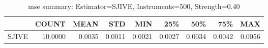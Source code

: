 \begin{table}[ht]
\centering
\caption{mse summary: Estimator=SJIVE, Instruments=500, Strength=0.40}
\begin{tabular}{lrrrrrrrr}
\toprule
 & COUNT & MEAN & STD & MIN & 25\% & 50\% & 75\% & MAX \\
\midrule
SJIVE & 10.0000 & 0.0035 & 0.0011 & 0.0021 & 0.0027 & 0.0034 & 0.0042 & 0.0056 \\
\bottomrule
\end{tabular}
\end{table}
